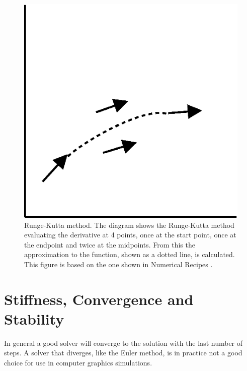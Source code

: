 \begin{figure}
	\begin{center}
    		\includegraphics[height=0.25\textheight]{Runge-Kutta}
	\end{center}
    \caption{\label{Fig:Euler}Runge-Kutta method. The diagram shows the
    Runge-Kutta method evaluating the derivative at 4 points, once at the start
    point, once at the endpoint and twice at the midpoints. From this the
    approximation to the function, shown as a dotted line, is calculated.
    This figure is based on the one shown in
    Numerical Recipes \cite{NumRecipes}.}
\end{figure}

\section{Stiffness, Convergence and Stability}
In general a good solver will converge to the solution with the last number of steps.
A solver that diverges, like the Euler method, is in practice not a good choice
for use in computer graphics simulations.
 
